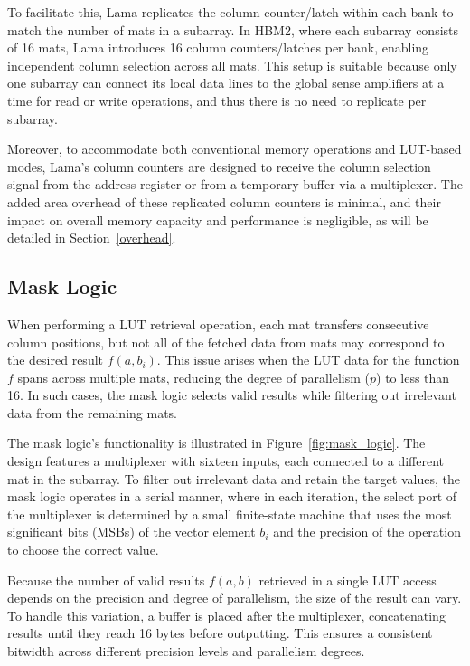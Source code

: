 To facilitate this, Lama replicates the column counter/latch within each bank to match the number of mats in a subarray. In HBM2, where each subarray consists of 16 mats, Lama introduces 16 column counters/latches per bank, enabling independent column selection across all mats. This setup is suitable because only one subarray can connect its local data lines to the global sense amplifiers at a time for read or write operations, and thus there is no need to replicate per subarray.

Moreover, to accommodate both conventional memory operations and LUT-based modes, Lama's column counters are designed to receive the column selection signal from the address register or from a temporary buffer via a multiplexer. The added area overhead of these replicated column counters is minimal, and their impact on overall memory capacity and performance is negligible, as will be detailed in Section~\ref{overhead}.

\subsection{Mask Logic}
When performing a LUT retrieval operation, each mat transfers consecutive column positions, but not all of the fetched data from mats may correspond to the desired result $f(a,b_{i})$. This issue arises when the LUT data for the function $f$ spans across multiple mats, reducing the degree of parallelism ($p$) to less than 16. In such cases, the mask logic selects valid results while filtering out irrelevant data from the remaining mats.

The mask logic's functionality is illustrated in Figure~\ref{fig:mask_logic}. The design features a multiplexer with sixteen inputs, each connected to a different mat in the subarray. To filter out irrelevant data and retain the target values, the mask logic operates in a serial manner, where in each iteration, the select port of the multiplexer is determined by a small finite-state machine that uses the most significant bits (MSBs) of the vector element $b_{i}$ and the precision of the operation to choose the correct value.


Because the number of valid results $f(a,b)$ retrieved in a single LUT access depends on the precision and degree of parallelism, the size of the result can vary. To handle this variation, a buffer is placed after the multiplexer, concatenating results until they reach 16 bytes before outputting. This ensures a consistent bitwidth across different precision levels and parallelism degrees.

